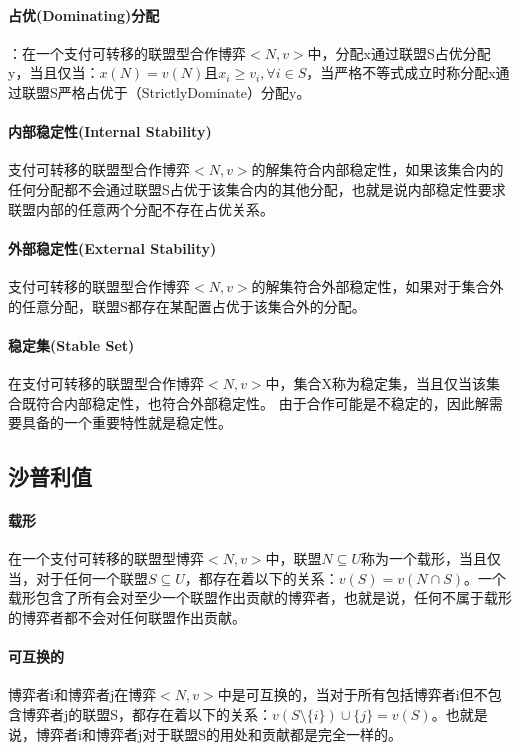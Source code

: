 \documentclass[12pt,a4paper]{article}
\begin{document}
\paragraph{占优(Dominating)分配} ：在一个支付可转移的联盟型合作博弈$<N,v>$中，分配x通过联盟S占优分配y，当且仅当：$x(N)=v(N)$且$x_i \geq v_i, \forall i \in S$，当严格不等式成立时称分配x通过联盟S严格占优于（StrictlyDominate）分配y。

\paragraph{内部稳定性(Internal Stability)} 支付可转移的联盟型合作博弈$<N,v>$的解集符合内部稳定性，如果该集合内的任何分配都不会通过联盟S占优于该集合内的其他分配，也就是说内部稳定性要求联盟内部的任意两个分配不存在占优关系。

\paragraph{外部稳定性(External Stability)} 支付可转移的联盟型合作博弈$<N,v>$的解集符合外部稳定性，如果对于集合外的任意分配，联盟S都存在某配置占优于该集合外的分配。
\paragraph{稳定集(Stable Set)} 在支付可转移的联盟型合作博弈$<N,v>$中，集合X称为稳定集，当且仅当该集合既符合内部稳定性，也符合外部稳定性。
由于合作可能是不稳定的，因此解需要具备的一个重要特性就是稳定性。

\subsection{沙普利值}
\paragraph{载形} 在一个支付可转移的联盟型博弈$<N,v>$中，联盟$N \subseteq U $称为一个载形，当且仅当，对于任何一个联盟$S \subseteq U$，都存在着以下的关系：$v(S)=v(N \cap S)$。一个载形包含了所有会对至少一个联盟作出贡献的博弈者，也就是说，任何不属于载形的博弈者都不会对任何联盟作出贡献。

\paragraph{可互换的} 博弈者i和博弈者j在博弈$<N,v>$中是可互换的，当对于所有包括博弈者i但不包含博弈者j的联盟S，都存在着以下的关系：$v(S \setminus \{i\})\cup\{j\}=v(S)$。也就是说，博弈者i和博弈者j对于联盟S的用处和贡献都是完全一样的。
\end{document}
